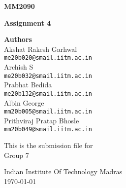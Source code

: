 \documentclass[12pt,a4paper]{article}
\begin{document}
\begin{titlepage}
	\begin{center}
		\vspace*{1cm}
		\Huge
		\textbf{MM2090}

		\vspace{0.5cm}
		\Large
		\textbf{Assignment 4}
            
		\vspace{1.5cm}
		\textbf{Authors}\\
		\vspace{0.25cm}
		\normalsize
		\textsf{Akshat Rakesh Garhwal}\\
		\texttt{me20b020@smail.iitm.ac.in}
		\\
		\textsf{Archish S}\\
		\texttt{me20b032@smail.iitm.ac.in}
		\\
		\textsf{Prabhat Bedida}\\
		\texttt{me20b132@smail.iitm.ac.in}
		\\
		\textsf{Albin George}\\
		\texttt{mm20b005@smail.iitm.ac.in}
		\\
		\textsf{Prithviraj Pratap Bhosle}\\
		\texttt{mm20b049@smail.iitm.ac.in}	
		
		\vfill
       
		This is the submission file for \\
		\Large       
		Group 7
        
        \normalsize    
		\vspace{0.8cm}
           
		Indian Institute Of Technology Madras\\
		\today
            
	\end{center}
\end{titlepage}

\tableofcontents

\newpage

\newpage

\newpage

\newpage

\newpage

\newpage


\newpage

 
\end{document}

